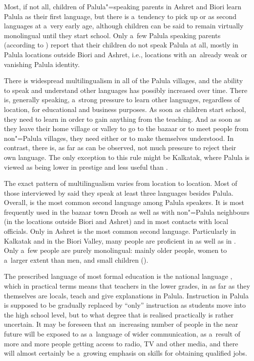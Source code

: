 Most, if not all, children of Palula"=speaking parents in Ashret and Biori learn Palula as their first language, but there is a~tendency to pick up \iliKhowar or \iliPashto as second languages at a~very early age, although children can be said to remain virtually monolingual until they start school. Only a~few Palula speaking parents (according to \citealt{decker1992a}) report that their children do not speak Palula at all, mostly in Palula locations outside Biori and Ashret, i.e., locations with an~already weak or vanishing Palula identity. 


\largerpage[-1]
There is widespread multilingualism in all of the Palula villages, and the ability to speak and understand other languages has possibly increased over time. There is, generally speaking, a~strong pressure to learn other languages, regardless of location, for educational and business purposes. As soon as children start school, they need to learn \iliUrdu in order to gain anything from the teaching. And as soon as they leave their home village or valley to go to the bazaar or to meet people from non"=Palula villages, they need either \iliKhowar or \iliPashto to make themselves understood. In contrast, there is, as far as can be observed, not much pressure to reject their own language. The only exception to this rule might be Kalkatak, where Palula is viewed as being lower in prestige and less useful than \iliKhowar.

\largerpage
The exact pattern of multilingualism varies from location to location. Most of those interviewed by \citet{decker1992a} said they speak at least three languages besides Palula. Overall, \iliKhowar is the most common second language among Palula speakers. It is most frequently used in the bazaar town Drosh as well as with non"=Palula neighbours (in the locations outside Biori and Ashret) and in most contacts with local officials. Only in Ashret is \iliPashto the most common second language. Particularly in Kalkatak and in the Biori Valley, many people are proficient in \iliKhowar as well as in \iliPashto. Only a~few people are purely monolingual: mainly older people, women to a~larger extent than men, and small children (\citealt{decker1992a}). 


The prescribed language of most formal education is the national language \iliUrdu, which in practical terms means that teachers in the lower grades, in as far as they themselves are locals, teach and give explanations in Palula. Instruction in Palula is supposed to be gradually replaced by ``\iliUrdu only'' instruction as students move into the high school level, but to what degree that is realised practically is rather uncertain. It may be foreseen that an~increasing number of people in the near future will be exposed to \iliUrdu as a~language of wider communication, as a~result of more and more people getting access to radio, TV and other media, and there will almost certainly be a~growing emphasis on \iliUrdu skills for obtaining qualified jobs.


